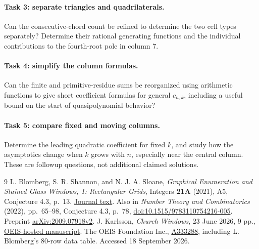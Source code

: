 \documentclass[11pt]{article}
\begin{document}
\paragraph{Task 3: separate triangles and quadrilaterals.}
Can the consecutive-chord count be refined to determine the two cell
types separately? Determine their rational generating functions and
the individual contributions to the fourth-root pole in column 7.

\paragraph{Task 4: simplify the column formulas.}
Can the finite and primitive-residue sums be reorganized using
arithmetic functions to give short coefficient formulas for general
\(c_{n,k}\), including a useful bound on the start of quasipolynomial
behavior?

\paragraph{Task 5: compare fixed and moving columns.}
Determine the leading quadratic coefficient for fixed \(k\), and
study how the asymptotics change when \(k\) grows with \(n\), especially
near the central column. These are followup questions, not additional
claimed solutions.

\begin{thebibliography}{9}
L. Blomberg, S. R. Shannon, and N. J. A. Sloane,
\emph{Graphical Enumeration and Stained Glass Windows, 1:
Rectangular Grids},
Integers \textbf{21A} (2021), A5, Conjecture 4.3, p.~13.
\href{https://math.colgate.edu/~integers/graham5/graham5.pdf}{Journal text}.
Also in \emph{Number Theory and Combinatorics} (2022), pp.~65--98,
Conjecture 4.3, p.~78,
\href{https://doi.org/10.1515/9783110754216-005}{doi:10.1515/9783110754216-005}.
Preprint \href{https://arxiv.org/abs/2009.07918}{arXiv:2009.07918v2}.
J. Karlsson, \emph{Church Windows}, 23 June 2026, 9 pp.,
\href{https://oeis.org/A334701/a334701_2.pdf}{OEIS-hosted manuscript}.
The OEIS Foundation Inc.,
\href{https://oeis.org/A333288}{A333288}, including L. Blomberg's
80-row data table. Accessed 18 September 2026.
\end{thebibliography}
\end{document}
